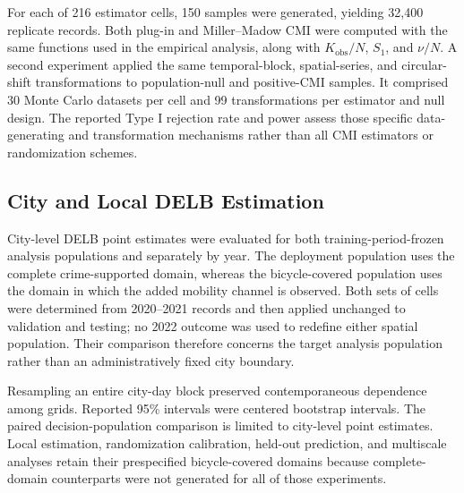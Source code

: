 For each of 216 estimator cells, 150 samples were generated, yielding
32,400 replicate records. Both plug-in and Miller--Madow CMI were computed
with the same functions used in the empirical analysis, along with
\(K_{\mathrm{obs}}/N\), \(S_1\), and \(\nu/N\). A second experiment applied
the same temporal-block, spatial-series, and circular-shift transformations
to population-null and positive-CMI samples. It comprised 30 Monte Carlo
datasets per cell and 99 transformations per estimator and null design.
The reported Type I rejection rate and power assess those
specific data-generating and transformation mechanisms rather than all CMI
estimators or randomization schemes.



\subsection{City and Local DELB Estimation}
\label{subsec:city_local_information}

City-level DELB point estimates were evaluated for both training-period-frozen
analysis populations and separately by year. The deployment population uses
the complete crime-supported domain, whereas the bicycle-covered population
uses the domain in
which the added mobility channel is observed. Both sets of cells were determined
from 2020--2021 records and then applied unchanged to validation and
testing; no 2022 outcome was used to redefine either spatial population.
Their comparison therefore concerns the target analysis population rather
than an administratively fixed city boundary.

 Resampling an entire city-day block preserved
contemporaneous dependence among grids. Reported 95\% intervals were
centered bootstrap intervals. The paired decision-population comparison is
limited to city-level point estimates. Local estimation, randomization
calibration, held-out prediction, and multiscale analyses retain their
prespecified bicycle-covered domains because complete-domain counterparts
were not generated for all of those experiments.

